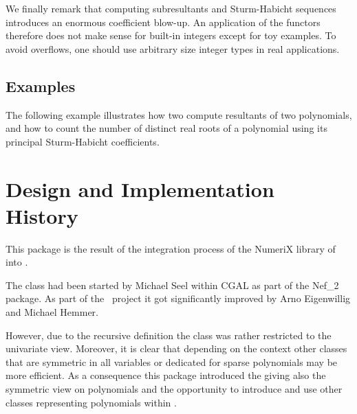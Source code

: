 We finally remark that computing subresultants and Sturm-Habicht sequences
introduces an enormous coefficient blow-up.
An application of the functors therefore does not make sense
for built-in integers except for toy examples.
To avoid overflows, one should use arbitrary size integer types
in real applications.

\subsection{Examples}

The following example illustrates how two compute resultants of two
polynomials, and how to count the number of distinct real roots
of a polynomial using its principal Sturm-Habicht coefficients.


\section{Design and Implementation History}

This package is the result of the integration process of the NumeriX library 
of \exacus~\cite{beh+-eeeafcs-05} into \cgal.

The class  had been started by Michael Seel within 
CGAL as part of the Nef\_2 package. As part of the \exacus\ project 
it got significantly improved by Arno Eigenwillig and Michael Hemmer. 

However, due to the recursive definition the class was rather restricted to the 
univariate view. Moreover, it is clear that depending on the context 
other classes that are symmetric in all variables or dedicated 
for sparse polynomials may be more efficient. As a consequence this package 
introduced the  giving also
the symmetric view on polynomials and the opportunity to introduce and use
other classes representing polynomials within \cgal. 

 


 
